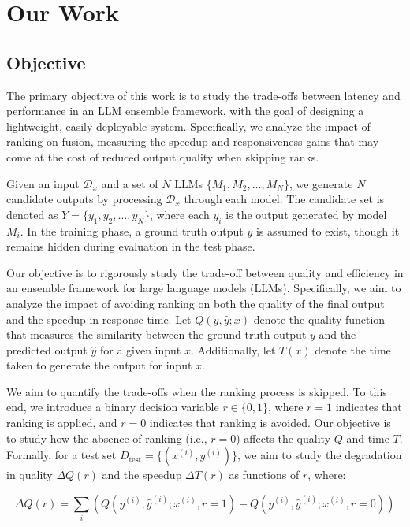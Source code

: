 \documentclass[sigconf,authordraft]{acmart}
\begin{document}
\section{Our Work}

\subsection{Objective}
The primary objective of this work is to study the trade-offs between latency and performance in an LLM ensemble framework, with the goal of designing a lightweight, easily deployable system. Specifically, we analyze the impact of ranking on fusion, measuring the speedup and responsiveness gains that may come at the cost of reduced output quality when skipping ranks.

Given an input \( \mathcal{D}_x \) and a set of \( N \) LLMs \( \{ M_1, M_2, \ldots, M_N \} \), we generate \( N \) candidate outputs by processing \( \mathcal{D}_x \) through each model. The candidate set is denoted as \( Y = \{ y_1, y_2, \ldots, y_N \} \), where each \( y_i \) is the output generated by model \( M_i \). In the training phase, a ground truth output \( y \) is assumed to exist, though it remains hidden during evaluation in the test phase.

Our objective is to rigorously study the trade-off between quality and efficiency in an ensemble framework for large language models (LLMs). Specifically, we aim to analyze the impact of avoiding ranking on both the quality of the final output and the speedup in response time. Let \( Q(y, \hat{y}; x) \) denote the quality function that measures the similarity between the ground truth output \( y \) and the predicted output \( \hat{y} \) for a given input \( x \). Additionally, let \( T(x) \) denote the time taken to generate the output for input \( x \).

We aim to quantify the trade-offs when the ranking process is skipped. To this end, we introduce a binary decision variable \( r \in \{0, 1\} \), where \( r = 1 \) indicates that ranking is applied, and \( r = 0 \) indicates that ranking is avoided. Our objective is to study how the absence of ranking (i.e., \( r = 0 \)) affects the quality \( Q \) and time \( T \). Formally, for a test set \( D_{\text{test}} = \{ (x^{(i)}, y^{(i)}) \} \), we aim to study the degradation in quality \( \Delta Q(r) \) and the speedup \( \Delta T(r) \) as functions of \( r \), where:

\[
\Delta Q(r) = \sum_{i} \left( Q(y^{(i)}, \hat{y}^{(i)}; x^{(i)}, r = 1) - Q(y^{(i)}, \hat{y}^{(i)}; x^{(i)}, r = 0) \right)
\]
\end{document}
